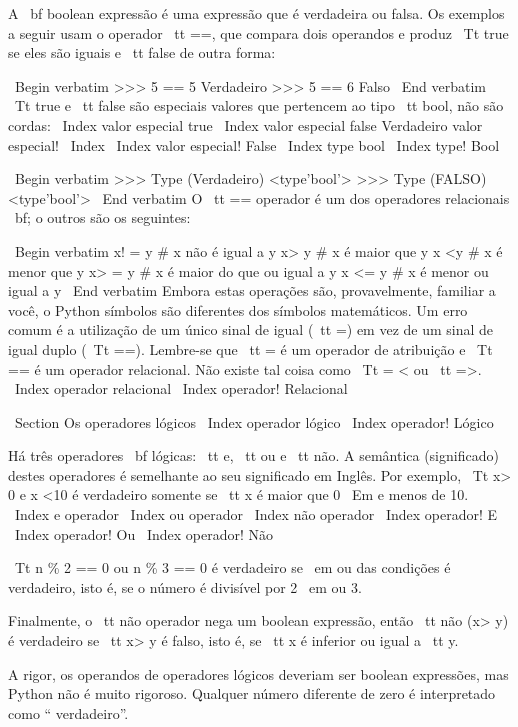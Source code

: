 \documentclass[10pt]{book}
\begin{document}
\begin {itemize}
{{A {\ bf boolean expressão} é uma expressão que é verdadeira
ou falsa. Os exemplos a seguir usam o
operador {\ tt ==}, que compara dois operandos e produz
{\ Tt true} se eles são iguais e {\ tt false} de outra forma:

\ Begin {verbatim}
>>> 5 == 5
Verdadeiro
>>> 5 == 6
Falso
\ End {verbatim}
%
{\ Tt true} e {\ tt false} são especiais
valores que pertencem ao tipo {\ tt bool}, não são cordas:
\ Index {valor especial true}
\ Index {valor especial false}
{Verdadeiro valor especial!} \ Index
\ Index {valor especial! False}
\ Index {type bool}
\ Index {type! Bool}

\ Begin {verbatim}
>>> Type (Verdadeiro)
<type'bool'>
>>> Type (FALSO)
<type'bool'>
\ End {verbatim}
%
O {\ tt ==} operador é um dos operadores relacionais {\ bf}; o
outros são os seguintes:

\ Begin {verbatim}
      x! = y # x não é igual a y
      x> y # x é maior que y
      x <y # x é menor que y
      x> = y # x é maior do que ou igual a y
      x <= y # x é menor ou igual a y
\ End {verbatim}
%
Embora estas operações são, provavelmente, familiar a você, o Python
símbolos são diferentes dos símbolos matemáticos. Um erro comum
é a utilização de um único sinal de igual ({\ tt =}) em vez de um sinal de igual duplo
({\ Tt ==}). Lembre-se que {\ tt =} é um operador de atribuição e
{\ Tt ==} é um operador relacional. Não existe tal coisa como
{\ Tt = <} ou {\ tt =>}.
\ Index {operador relacional}
\ Index {operador! Relacional}


\ Section {} Os operadores lógicos
\ Index {operador lógico}
\ Index {operador! Lógico}

Há três operadores {\ bf lógicas}: {\ tt e}, {\ tt
ou} e {\ tt não}. A semântica (significado) destes operadores é
semelhante ao seu significado em Inglês. Por exemplo,
{\ Tt x> 0 e x <10} é verdadeiro somente se {\ tt x} é maior que 0
{\ Em} e menos de 10.
\ Index {} e operador
\ Index {} ou operador
\ Index {} não operador
\ Index {operador! E}
\ Index {operador! Ou}
\ Index {operador! Não}

{\ Tt n \% 2 == 0 ou n \% 3 == 0} é verdadeiro se {\ em ou} das condições
é verdadeiro, isto é, se o número é divisível por 2 {\ em ou} 3.

Finalmente, o {\ tt não} operador nega um boolean
expressão, então {\ tt não (x> y)} é verdadeiro se {\ tt x> y} é falso,
isto é, se {\ tt x} é inferior ou igual a {\ tt y}.

A rigor, os operandos de operadores lógicos deveriam ser
boolean expressões, mas Python não é muito rigoroso.
Qualquer número diferente de zero é interpretado como `` verdadeiro''.

}}
\end{itemize}
\end{document}
